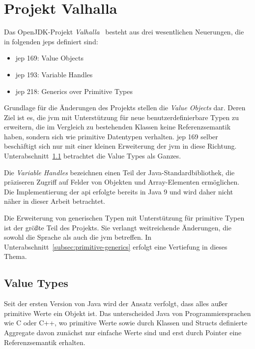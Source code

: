 \section{Projekt Valhalla}\label{sec:valhalla}

Das OpenJDK-Projekt \emph{Valhalla}~\cite{openjdk-valhalla} besteht aus drei wesentlichen Neuerungen, die in folgenden \acp{jep} definiert sind:

\begin{itemize}
    \item \ac{jep} 169: Value Objects~\cite{jep-169}
    \item \ac{jep} 193: Variable Handles~\cite{jep-193}
    \item \ac{jep} 218: Generics over Primitive Types~\cite{jep-218}
\end{itemize}

Grundlage für die Änderungen des Projekts stellen die \emph{Value Objects} dar.
Deren Ziel ist es, die \ac{jvm} mit Unterstützung für neue benutzerdefinierbare Typen zu erweitern, die im Vergleich zu bestehenden Klassen keine Referenzsemantik haben, sondern sich wie primitive Datentypen verhalten.
\ac{jep} 169 selber beschäftigt sich nur mit einer kleinen Erweiterung der \ac{jvm} in diese Richtung.
Unterabschnitt~\ref{subsec:value-types} betrachtet die Value Types als Ganzes.

Die \emph{Variable Handles} bezeichnen einen Teil der Java-Standardbibliothek, die präziseren Zugriff auf Felder von Objekten und Array-Elementen ermöglichen.
Die Implementierung der \ac{api} erfolgte bereits in Java 9 und wird daher nicht näher in dieser Arbeit betrachtet.

Die Erweiterung von generischen Typen mit Unterstützung für primitive Typen ist der größte Teil des Projekts.
Sie verlangt weitreichende Änderungen, die sowohl die Sprache als auch die \ac{jvm} betreffen.
In Unterabschnitt~\ref{subsec:primitive-generics} erfolgt eine Vertiefung in dieses Thema.

\subsection{Value Types}\label{subsec:value-types}

Seit der ersten Version von Java wird der Ansatz verfolgt, dass alles außer primitive Werte ein Objekt ist.
Das unterscheided Java von Programmiersprachen wie C oder C++, wo primitive Werte sowie durch Klassen und Structs definierte Aggregate davon zunächst nur einfache Werte sind und erst durch Pointer eine Referenzsemantik erhalten.

